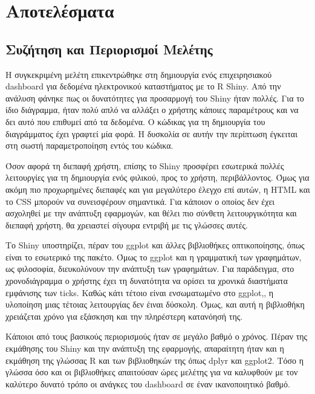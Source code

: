 \documentclass{article}
\begin{document}
\newpage

\section{Αποτελέσματα}

\subsection{Συζήτηση και Περιορισμοί Μελέτης}

Η συγκεκριμένη μελέτη επικεντρώθηκε στη δημιουργία ενός επιχειρησιακού dashboard για δεδομένα ηλεκτρονικού καταστήματος με το R Shiny. Από την ανάλυση φάνηκε πως οι δυνατότητες για προσαρμογή του Shiny ήταν πολλές. Για το ίδιο διάγραμμα, ήταν πολύ απλό να αλλάξει ο χρήστης κάποιες παραμέτρους και να δει αυτό που επιθυμεί από τα δεδομένα. Ο κώδικας για τη δημιουργία του διαγράμματος έχει γραφτεί μία φορά. Η δυσκολία σε αυτήν την περίπτωση έγκειται στη σωστή παραμετροποίηση εντός του κώδικα.

Όσον αφορά τη διεπαφή χρήστη, επίσης το Shiny προσφέρει εσωτερικά πολλές λειτουργίες για τη δημιουργία ενός φιλικού, προς το χρήστη, περιβάλλοντος. Όμως για ακόμη πιο προχωρημένες διεπαφές και για μεγαλύτερο έλεγχο επί αυτών, η HTML και το CSS μπορούν να συνεισφέρουν σημαντικά. Για κάποιον ο οποίος δεν έχει ασχοληθεί με την ανάπτυξη εφαρμογών, και θέλει πιο σύνθετη λειτουργικότητα και διεπαφή χρήστη, θα χρειαστεί σίγουρα εντριβή με τις γλώσσες αυτές.

Το Shiny υποστηρίζει, πέραν του ggplot και άλλες βιβλιοθήκες οπτικοποίησης, όπως είναι το εσωτερικό της πακέτο. Όμως το ggplot και η γραμματική των γραφημάτων, ως φιλοσοφία, διευκολύνουν την ανάπτυξη των γραφημάτων. Για παράδειγμα, στο χρονοδιάγραμμα ο χρήστης έχει τη δυνατότητα να ορίσει τα χρονικά διαστήματα εμφάνισης των ticks. Καθώς κάτι τέτοιο είναι ενσωματωμένο στο ggplot,, η υλοποίηση μιας τέτοιας λειτουργίας δεν έιναι δύσκολη. Όμως, και αυτή η βιβλιοθήκη χρειάζεται χρόνο για εξάσκηση και την πληρέστερη κατανόησή της.

Κάποιοι από τους βασικούς περιορισμούς ήταν σε μεγάλο βαθμό ο χρόνος. Πέραν της εκμάθησης του Shiny και την ανάπτυξη της εφαρμογής, απαραίτητη ήταν και η εκμάθηση της γλώσσας R και των βιβλιοθηκών της όπως dplyr και ggplot2. Τόσο η γλώσσα όσο και οι βιβλιοθήκες απαιτούσαν ώρες μελέτης για να καλυφθούν με τον καλύτερο δυνατό τρόπο οι ανάγκες του dashboard σε έναν ικανοποιητικό βαθμό.
\end{document}

